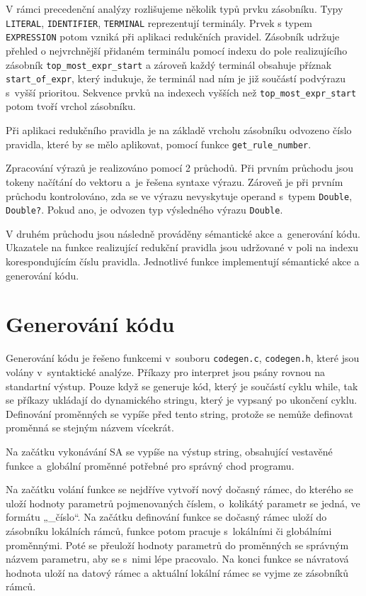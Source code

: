 \documentclass[11pt]{article}
\begin{document}
V rámci precedenční analýzy rozlišujeme několik typů prvku zásobníku. Typy \texttt{LITERAL}, \texttt{IDENTIFIER}, \texttt{TERMINAL} reprezentují terminály.
Prvek s typem \texttt{EXPRESSION} potom vzniká při aplikaci redukčních pravidel.
Zásobník udržuje přehled o nejvrchnější přidaném terminálu pomocí indexu do pole realizujícího zásobník \texttt{top\_most\_expr\_start}
a zároveň každý terminál obsahuje příznak \texttt{start\_of\_expr}, který indukuje, že terminál nad ním je již součástí podvýrazu s~vyšší prioritou.
Sekvence prvků na indexech vyšších než \texttt{top\_most\_expr\_start} potom tvoří vrchol zásobníku.

Při aplikaci redukčního pravidla je na základě vrcholu zásobníku odvozeno číslo pravidla, které by se mělo aplikovat, pomocí funkce \texttt{get\_rule\_number}.


Zpracování výrazů je realizováno pomocí 2 průchodů. Při prvním průchodu jsou tokeny načítání do vektoru a~je řešena syntaxe výrazu.
Zároveň je při prvním průchodu kontrolováno, zda se ve výrazu nevyskytuje operand s~typem \texttt{Double}, \texttt{Double?}. Pokud
ano, je odvozen typ výsledného výrazu \texttt{Double}.

V druhém průchodu jsou následně prováděny sémantické akce a~generování kódu.
Ukazatele na funkce realizující redukční pravidla jsou udržované v poli na indexu korespondujícím
číslu pravidla. Jednotlivé funkce implementují sémantické akce a generování kódu.












\section{Generování kódu}
Generování kódu je řešeno funkcemi v~souboru \texttt{codegen.c},  \texttt{codegen.h},
které jsou volány v~syntaktické analýze.
Příkazy pro interpret jsou psány rovnou na standartní výstup.
Pouze když se generuje kód, který je součástí cyklu while, tak se příkazy ukládají
do dynamického stringu, který je vypsaný po ukončení cyklu.
Definování proměnných se vypíše před tento string, protože se nemůže definovat proměnná se stejným názvem vícekrát.

Na začátku vykonávání SA se vypíše na výstup string, obsahující vestavěné funkce a~globální proměnné potřebné pro správný chod programu.

Na začátku volání funkce se nejdříve vytvoří nový dočasný rámec, do kterého se uloží hodnoty parametrů pojmenovaných číslem,
o~kolikátý parametr se jedná, ve formátu „\_číslo“. Na začátku definování funkce se dočasný rámec uloží do zásobníku
lokálních rámců, funkce potom pracuje s~lokálními či globálními proměnnými.
Poté se přeuloží hodnoty parametrů do proměnných se správným názvem parametru, aby se s~nimi lépe pracovalo.
Na konci funkce se návratová hodnota uloží na datový rámec a aktuální lokální rámec se vyjme ze zásobníků rámců.
\end{document}
